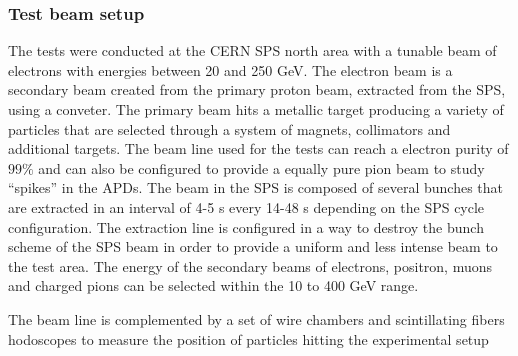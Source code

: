\subsubsection{Test beam setup}
The tests were conducted at the CERN SPS north area with a tunable beam of electrons with energies between 20 and 250 GeV.
The electron beam is a secondary beam created from the primary proton beam, extracted from the SPS, using a conveter.
The primary beam hits a metallic target producing a variety of particles that are selected through a system of magnets, collimators
and additional targets. The beam line used for the tests can reach a electron purity of $99\%$ and can also be
configured to provide a equally pure pion beam to study ``spikes'' in the APDs.
The beam in the SPS is composed of several bunches that are extracted in an interval of 4-5 s every 14-48 s depending on the
SPS cycle configuration. The extraction line is configured in a way to destroy the bunch scheme of the SPS beam in order
to provide a uniform and less intense beam to the test area.
The energy of the secondary beams of electrons, positron, muons and charged pions can be selected within the 10 to 400 GeV
range. 

The beam line is complemented by a set of wire chambers and scintillating fibers hodoscopes to measure the position of
particles hitting the experimental setup



